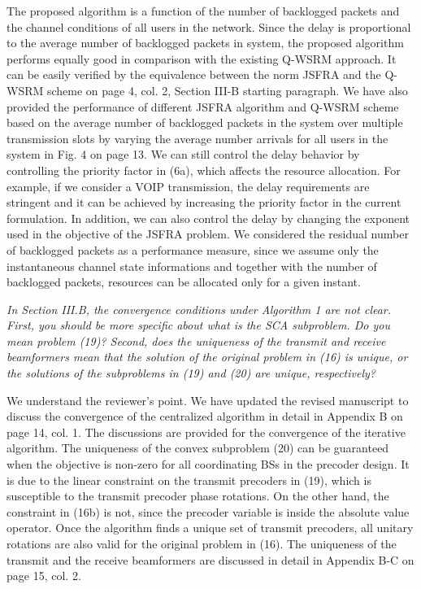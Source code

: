 \begin{itemize}
\resp The proposed algorithm is a function of the number of backlogged packets and the channel conditions of all users in the network. Since the delay is proportional to the average number of backlogged packets in system, the proposed algorithm performs equally good in comparison with the existing Q-WSRM approach. It can be easily verified by the equivalence between the  norm JSFRA and the Q-WSRM scheme on page 4, col. 2, Section III-B starting paragraph. We have also provided the performance of different JSFRA algorithm and Q-WSRM scheme based on the average number of backlogged packets in the system over multiple transmission slots by varying the average number arrivals for all users in the system in Fig. 4 on page 13. We can still control the delay behavior by controlling the priority factor  in (6a), which affects the resource allocation. For example, if we consider a VOIP transmission, the delay requirements are stringent and it can be achieved by increasing the priority factor  in the current formulation. In addition, we can also control the delay by changing the exponent used in the objective  of the JSFRA problem. We considered the residual number of backlogged packets as a performance measure, since we assume only the instantaneous channel state informations and together with the number of backlogged packets, resources can be allocated only for a given instant.

 \textit{In Section III.B, the convergence conditions under Algorithm 1 are not clear. First, you should be more specific about what is the SCA subproblem. Do you mean problem (19)? Second, does the uniqueness of the transmit and receive beamformers mean that the solution of the original problem in (16) is unique, or the solutions of the subproblems in (19) and (20) are unique, respectively?}

\resp We understand the reviewer's point. We have updated the revised manuscript to discuss the convergence of the centralized algorithm in detail in Appendix B on page 14, col. 1. The discussions are provided for the convergence of the iterative algorithm. The uniqueness of the convex subproblem (20) can be guaranteed when the objective is non-zero for all coordinating BSs in the precoder design. It is due to the linear constraint on the transmit precoders in (19), which is susceptible to the transmit precoder phase rotations. On the other hand, the constraint in (16b) is not, since the precoder variable is inside the absolute value operator. Once the algorithm finds a unique set of transmit precoders, all unitary rotations are also valid for the original problem in (16). The uniqueness of the transmit and the receive beamformers are discussed in detail in Appendix B-C on page 15, col. 2.


\end{itemize}
